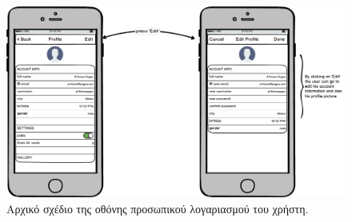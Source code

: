\begin{figure}[H]
    \centering
    \includegraphics[scale=0.25]{figures/profile.png}
    \caption{Αρχικό σχέδιο της οθόνης προσωπικού λογαριασμού του χρήστη.}
    \label{profilemockup}
\end{figure}


